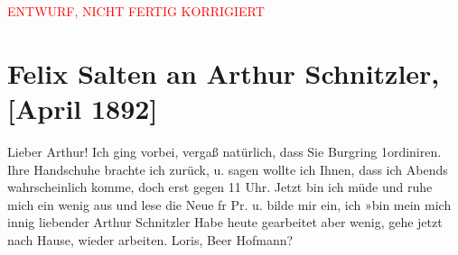 
\begin{center}
            \textcolor{red}{ENTWURF, NICHT FERTIG KORRIGIERT}
                      \end{center}
            
         
         \renewcommand{\erwaehntePersonen}{Personen: Richard Beer-Hofmann, Hugo von Hofmannsthal}
         \renewcommand{\erwaehnteOrte}{Orte: Burgring, Ordination Dr. Arthur Schnitzler, Wien}
         \renewcommand{\erwaehnteWerke}{Werke: Neue Freie Presse}
               \section[Felix Salten an Arthur Schnitzler, {[}April 1892{]}]{ Felix Salten an Arthur Schnitzler, {[}April 1892{]}}\nopagebreak{}\rehead{ }\begin{ledgroupsized}[t]{13cm}\normalsize\beginnumbering \toendnotes[C]{\smallbreak\pagebreak[2]} 
\pstart
           \noindent{}{\pb}Lieber Arthur! Ich ging vorbei, vergaß natürlich, dass Sie Burgring 1ordiniren. Ihre Handschuhe brachte ich zurück,
               u. sagen wollte ich Ihnen, dass ich Abends wahrscheinlich komme, doch erst gegen
                  11 Uhr. Jetzt bin ich müde und ruhe mich {\pb}ein wenig aus und lese die
                  Neue fr Pr. u. bilde mir ein, ich »bin mein
               mich innig liebender \pend
           \pstart
           \centering{}Arthur Schnitzler\pend
           \pstart
           \noindent{}Habe heute gearbeitet aber wenig, gehe jetzt nach Hause, wieder arbeiten.\pend
           \pstart
           Loris, Beer
                  Hofmann?\pend
           
         
         \endnumbering{}\end{ledgroupsized}\begin{anhang}\end{anhang}\newcommand{\dateiname}{L03184}\newcommand{\titel}{Felix Salten an Arthur Schnitzler, [April 1892]}\newcommand{\editorInnen}{Martin Anton Müller und Laura Untner}
      